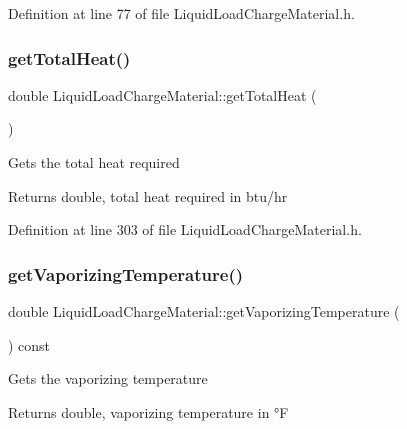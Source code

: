 Definition at line 77 of file Liquid\+Load\+Charge\+Material.\+h.

\mbox{\label{class_liquid_load_charge_material_a51a9826325e2c34cd073b8766331d476}} 
\subsubsection{\texorpdfstring{get\+Total\+Heat()}{getTotalHeat()}}
{\footnotesize\ttfamily double Liquid\+Load\+Charge\+Material\+::get\+Total\+Heat (\begin{DoxyParamCaption}{ }\end{DoxyParamCaption})\hspace{0.3cm}{\ttfamily [inline]}}

Gets the total heat required

\begin{DoxyReturn}{Returns}
double, total heat required in btu/hr 
\end{DoxyReturn}


Definition at line 303 of file Liquid\+Load\+Charge\+Material.\+h.

\mbox{\label{class_liquid_load_charge_material_a07004e345fb4ff287d435d0c84027973}} 
\subsubsection{\texorpdfstring{get\+Vaporizing\+Temperature()}{getVaporizingTemperature()}}
{\footnotesize\ttfamily double Liquid\+Load\+Charge\+Material\+::get\+Vaporizing\+Temperature (\begin{DoxyParamCaption}{ }\end{DoxyParamCaption}) const\hspace{0.3cm}{\ttfamily [inline]}}

Gets the vaporizing temperature \begin{DoxyReturn}{Returns}
double, vaporizing temperature in °F 
\end{DoxyReturn}


